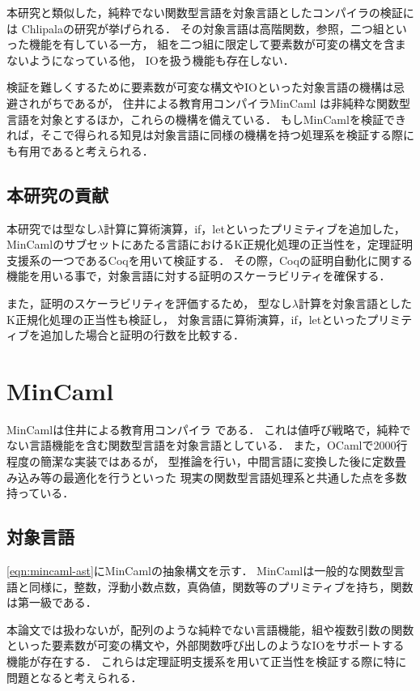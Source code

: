 \documentclass[T]{compsoft}
\begin{document}
本研究と類似した，純粋でない関数型言語を対象言語としたコンパイラの検証には
Chlipalaの研究\cite{ImpurePOPL10}が挙げられる．
その対象言語は高階関数，参照，二つ組といった機能を有している一方，
組を二つ組に限定して要素数が可変の構文を含まないようになっている他，
IOを扱う機能も存在しない．

検証を難しくするために要素数が可変な構文やIOといった対象言語の機構は忌避されがちであるが，
住井による教育用コンパイラMinCaml\cite{DBLP:conf/icfp/Sumii05} \cite{MinCaml110006664764}は非純粋な関数型言語を対象とするほか，これらの機構を備えている．
もしMinCamlを検証できれば，そこで得られる知見は対象言語に同様の機構を持つ処理系を検証する際にも有用であると考えられる．

\subsection{本研究の貢献}
本研究では型なし$\lambda$計算に算術演算，if，letといったプリミティブを追加した，
MinCamlのサブセットにあたる言語におけるK正規化処理の正当性を，定理証明支援系の一つであるCoqを用いて検証する．
その際，Coqの証明自動化に関する機能を用いる事で，対象言語に対する証明のスケーラビリティを確保する．

また，証明のスケーラビリティを評価するため，
型なし$\lambda$計算を対象言語としたK正規化処理の正当性も検証し，
対象言語に算術演算，if，letといったプリミティブを追加した場合と証明の行数を比較する．

\section{MinCaml}
MinCamlは住井による教育用コンパイラ\cite{DBLP:conf/icfp/Sumii05} \cite{MinCaml110006664764}である．
これは値呼び戦略で，純粋でない言語機能を含む関数型言語を対象言語としている．
また，OCamlで2000行程度の簡潔な実装ではあるが，
型推論を行い，中間言語に変換した後に定数畳み込み等の最適化を行うといった
現実の関数型言語処理系と共通した点を多数持っている．

\subsection{対象言語}
\figurename\ref{eqn:mincaml-ast}にMinCamlの抽象構文を示す．
MinCamlは一般的な関数型言語と同様に，整数，浮動小数点数，真偽値，関数等のプリミティブを持ち，関数は第一級である．

本論文では扱わないが，配列のような純粋でない言語機能，組や複数引数の関数といった要素数が可変の構文や，外部関数呼び出しのようなIOをサポートする機能が存在する．
これらは定理証明支援系を用いて正当性を検証する際に特に問題となると考えられる．
\end{document}
